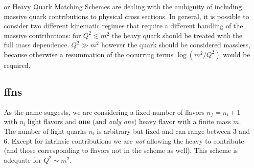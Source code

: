 
\fns or Heavy Quark Matching Schemes are dealing with the ambiguity of
including massive quark contributions to physical cross sections. 
%
In general, it is possible to consider two different kinematic regimes that
require a different handling of the massive contributions: for $Q^2 \lesssim
m^2$ the heavy quark should be treated with the full mass dependence. 
$Q^2 \gg m^2$ however the quark should be considered massless, because
otherwise a resummation of the occurring terms $\log(m^2/Q^2)$ would be
required.

\subsection[Fixed]{\acrlong{ffns}}
\label{sec:dis/ffns}

As the name \ffns suggests, we are considering a fixed number of flavors
$n_f=n_l+1$ with $n_l$ light flavors and \textbf{one} (and \textit{only one})
heavy flavor\textit{} with a finite mass $m$.
The number of light quarks $n_l$ is arbitrary but fixed and can range between
$3$ and $6$. 
Except for intrinsic contributions we are \textit{not} allowing the heavy \pdf
to contribute (and those corresponding to flavors not in the scheme as well).
%
This scheme is adequate for $Q^2\sim m^2$.

